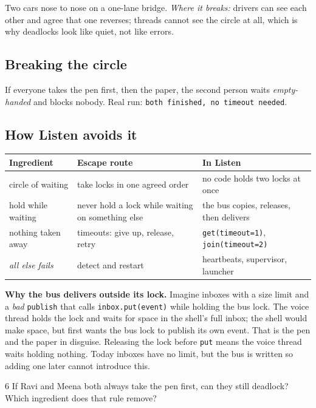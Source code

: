 \documentclass[11pt,a4paper]{article}
\begin{document}
\begin{analogy}
Two cars nose to nose on a one-lane bridge. \emph{Where it breaks:} drivers can see each other and
agree that one reverses; threads cannot see the circle at all, which is why deadlocks look like
quiet, not like errors.
\end{analogy}

\subsection{Breaking the circle}
If everyone takes the pen first, then the paper, the second person waits \emph{empty-handed} and
blocks nobody. Real run: \texttt{both finished, no timeout needed}.

\subsection{How Listen avoids it}
\begin{center}
\renewcommand{\arraystretch}{1.15}
\begin{tabularx}{\textwidth}{p{3.2cm} X X}
\toprule
\textbf{Ingredient} & \textbf{Escape route} & \textbf{In Listen} \\
\midrule
circle of waiting & take locks in one agreed order & no code holds two locks at once \\
hold while waiting & never hold a lock while waiting on something else & the bus copies, releases, then delivers \\
nothing taken away & timeouts: give up, release, retry & \texttt{get(timeout=1)}, \texttt{join(timeout=2)} \\
\emph{all else fails} & detect and restart & heartbeats, supervisor, launcher \\
\bottomrule
\end{tabularx}
\end{center}
\noindent \textbf{Why the bus delivers outside its lock.} Imagine inboxes with a size limit and a
\emph{bad} \texttt{publish} that calls \texttt{inbox.put(event)} while holding the bus lock. The
voice thread holds the lock and waits for space in the shell's full inbox; the shell would make
space, but first wants the bus lock to publish its own event. That is the pen and the paper in
disguise. Releasing the lock before \texttt{put} means the voice thread waits holding nothing.
Today inboxes have no limit, but the bus is written so adding one later cannot introduce this.

\begin{quickcheck}{6}
If Ravi and Meena both always take the pen first, can they still deadlock? Which ingredient does
that rule remove?
\end{quickcheck}
\end{document}
